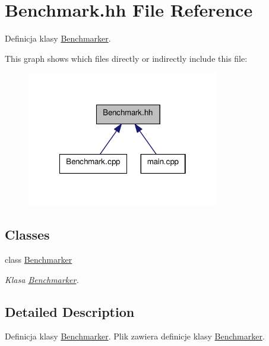\hypertarget{a00009}{\section{Benchmark.\-hh File Reference}
\label{a00009}
}


Definicja klasy \hyperlink{a00002}{Benchmarker}.  


This graph shows which files directly or indirectly include this file\-:\nopagebreak
\begin{figure}[H]
\begin{center}
\leavevmode
\includegraphics[width=238pt]{a00023}
\end{center}
\end{figure}
\subsection*{Classes}
\begin{DoxyCompactItemize}
\item 
class \hyperlink{a00002}{Benchmarker}
\begin{DoxyCompactList}\small\item\em Klasa \hyperlink{a00002}{Benchmarker}. \end{DoxyCompactList}\end{DoxyCompactItemize}


\subsection{Detailed Description}
Definicja klasy \hyperlink{a00002}{Benchmarker}. Plik zawiera definicje klasy \hyperlink{a00002}{Benchmarker}. 